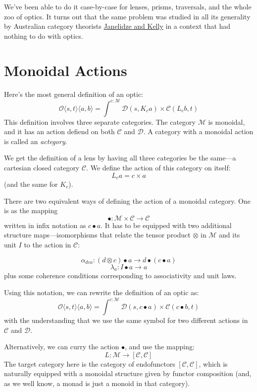 \documentclass[11pt]{amsart}
\begin{document}
We've been able to do it case-by-case for lenses, prisms, traversals, and the whole zoo of optics. It turns out that the same problem was studied in all its generality by Australian category theorists \href{http://www.tac.mta.ca/tac/volumes/9/n4/n4.pdf}{Janelidze and Kelly} in a context that had nothing to do with optics.

\section{Monoidal Actions}

Here's the most general definition of an optic:
\[ \mathcal{O}\langle s, t\rangle \langle a, b \rangle = \int^{c \colon \mathcal{M}} \mathcal{D}(s, K_c a) \times  \mathcal{C}(L_c b, t) \]
This definition involves three separate categories. The category $\mathcal{M}$ is monoidal, and it has an action defiend on both $\mathcal{C}$ and $\mathcal{D}$. A category with a monoidal action is called an \emph{actegory}.

We get the definition of a lens by having all three categories be the same---a cartesian closed category $\mathcal{C}$. We define the action of this category on itself:
\[L_c a = c \times a \]
(and the same for $K_c$). 

There are two equivalent ways of defining the action of a monoidal category. One is as the mapping 
\[ \bullet \colon \mathcal{M} \times \mathcal{C} \to \mathcal{C} \]
written in infix notation as $c \bullet a$. It has to be equipped with two additional structure maps---isomorphisms that relate the tensor product $\otimes$ in $\mathcal{M}$ and its unit $I$ to the action in $\mathcal{C}$:

\[ \alpha_{d c a} \colon (d \otimes c) \bullet a  \to d \bullet (c \bullet a) \]
\[ \lambda_a \colon I \bullet a \to a \]
plus some coherence conditions corresponding to associativity and unit laws. 

Using this notation, we can rewrite the definition of an optic as:
\[ \mathcal{O}\langle s, t\rangle \langle a, b \rangle = \int^{c \colon \mathcal{M}} \mathcal{D}(s, c \bullet a) \times  \mathcal{C}(c \bullet b, t) \]
with the understanding that we use the same symbol for two different actions in $\mathcal{C}$ and $\mathcal{D}$.

Alternatively, we can curry the action $\bullet$, and use the mapping:
\[ L \colon \mathcal{M} \to [\mathcal{C}, \mathcal{C}] \]
The target category here is the category of endofunctors $[\mathcal{C}, \mathcal{C}]$, which is naturally equipped with a monoidal structure given by functor composition (and, as we well know, a monad is just a monoid in that category). 
\end{document}
